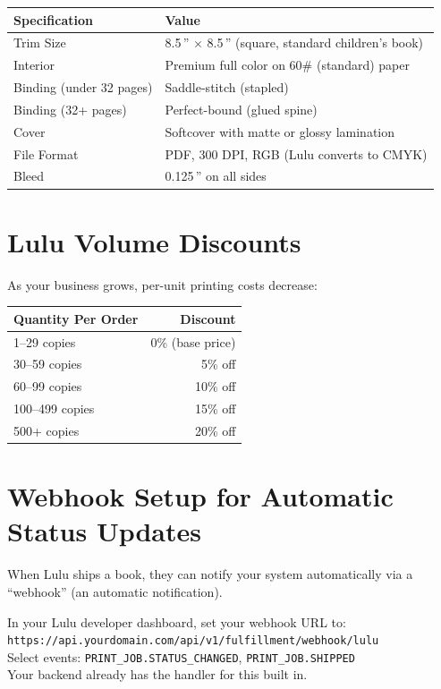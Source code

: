 \documentclass[12pt, letterpaper, oneside]{book}
\begin{document}
\begin{table}[H]
\centering
\begin{tabularx}{\textwidth}{lX}
\toprule
\textbf{Specification} & \textbf{Value} \\
\midrule
Trim Size & 8.5\,'' $\times$ 8.5\,'' (square, standard children's book) \\
Interior & Premium full color on 60\# (standard) paper \\
Binding (under 32 pages) & Saddle-stitch (stapled) \\
Binding (32+ pages) & Perfect-bound (glued spine) \\
Cover & Softcover with matte or glossy lamination \\
File Format & PDF, 300 DPI, RGB (Lulu converts to CMYK) \\
Bleed & 0.125\,'' on all sides \\
\bottomrule
\end{tabularx}
\end{table}

\section{Lulu Volume Discounts}

As your business grows, per-unit printing costs decrease:

\begin{table}[H]
\centering
\begin{tabular}{lr}
\toprule
\textbf{Quantity Per Order} & \textbf{Discount} \\
\midrule
1--29 copies & 0\% (base price) \\
30--59 copies & 5\% off \\
60--99 copies & 10\% off \\
100--499 copies & 15\% off \\
500+ copies & 20\% off \\
\bottomrule
\end{tabular}
\end{table}

\section{Webhook Setup for Automatic Status Updates}

When Lulu ships a book, they can notify your system automatically via a ``webhook'' (an automatic notification).

\begin{actionbox}
In your Lulu developer dashboard, set your webhook URL to:\\[4pt]
\texttt{https://api.yourdomain.com/api/v1/fulfillment/webhook/lulu}\\[4pt]
Select events: \texttt{PRINT\_JOB.STATUS\_CHANGED}, \texttt{PRINT\_JOB.SHIPPED}\\[4pt]
Your backend already has the handler for this built in.
\end{actionbox}
\end{document}
